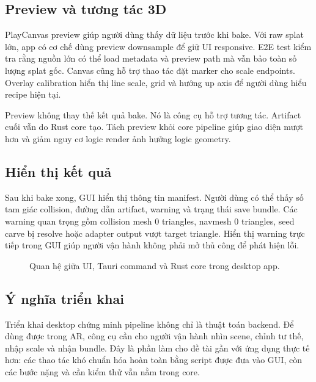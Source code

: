 \subsection{Preview và tương tác 3D}

PlayCanvas preview giúp người dùng thấy dữ liệu trước khi bake. Với raw splat lớn, app có cơ chế dùng preview downsample để giữ UI responsive. E2E test kiểm tra rằng nguồn lớn có thể load metadata và preview path mà vẫn bảo toàn số lượng splat gốc. Canvas cũng hỗ trợ thao tác đặt marker cho scale endpoints. Overlay calibration hiển thị line scale, grid và hướng up axis để người dùng hiểu recipe hiện tại.

Preview không thay thế kết quả bake. Nó là công cụ hỗ trợ tương tác. Artifact cuối vẫn do Rust core tạo. Tách preview khỏi core pipeline giúp giao diện mượt hơn và giảm nguy cơ logic render ảnh hưởng logic geometry.

\subsection{Hiển thị kết quả}

Sau khi bake xong, GUI hiển thị thông tin manifest. Người dùng có thể thấy số tam giác collision, đường dẫn artifact, warning và trạng thái save bundle. Các warning quan trọng gồm collision mesh 0 triangles, navmesh 0 triangles, seed carve bị resolve hoặc adapter output vượt target triangle. Hiển thị warning trực tiếp trong GUI giúp người vận hành không phải mở  thủ công để phát hiện lỗi.

\begin{figure}[H]
\centering
{}
\caption{Quan hệ giữa UI, Tauri command và Rust core trong desktop app.}
\end{figure}

\subsection{Ý nghĩa triển khai}

Triển khai desktop chứng minh pipeline không chỉ là thuật toán backend. Để dùng được trong AR, công cụ cần cho người vận hành nhìn scene, chỉnh tư thế, nhập scale và nhận bundle. Đây là phần làm cho đề tài gần với ứng dụng thực tế hơn: các thao tác khó chuẩn hóa hoàn toàn bằng script được đưa vào GUI, còn các bước nặng và cần kiểm thử vẫn nằm trong core.
